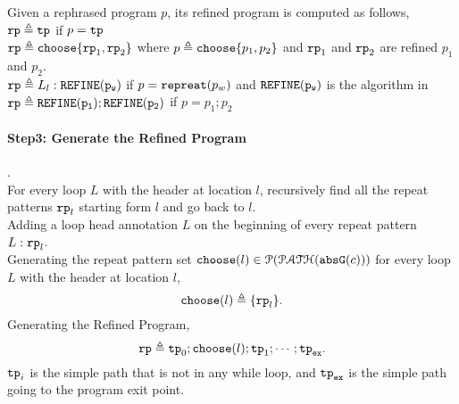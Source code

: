   Given a rephrased program $p$, its refined program is computed as follows,
  \\
  $\mathtt{rp} \triangleq \mathtt{tp} $ if $p = \mathtt{tp}$\\
  $\mathtt{rp} \triangleq \mathtt{choose}\{\mathtt{rp}_1, \mathtt{rp}_2 \}$ where $p \triangleq \mathtt{choose}\{p_1, p_2 \}$ and 
    $\mathtt{rp}_1$ and $\mathtt{rp}_2$ are refined $p_1$ and $p_2$. 
    \\
  $\mathtt{rp} \triangleq L_l : \mathtt{REFINE(p_w)}$  if $p = \mathtt{repreat}(p_w)$ and  $\mathtt{REFINE(p_w)}$ is the algorithm in \\
  $\mathtt{rp} \triangleq \mathtt{REFINE(p_1)}; \mathtt{REFINE(p_2)}$  if $p = p_1; p_2$ 
\paragraph{Step3: Generate the Refined Program}.
\\
For every loop $L$ with the header at location $l$,
recursively 
find all the repeat patterns $\mathtt{rp}_l$ starting form $l$ and go back to $l$.
\\
Adding a loop head annotation $L$ on the beginning of every repeat pattern $L: \mathtt{rp}_l$.
\\
Generating the repeat pattern set $\mathtt{choose}(l) \in \mathcal{P}(\mathcal{PATH}(\mathtt{abs}{\mathtt{G}}(c)))$
for every loop $L$ with the header at location $l$,
$$\mathtt{choose}(l) \triangleq \{ \mathtt{rp}_l \}.$$
Generating the Refined Program,
%
$$\mathtt{rp} \triangleq \mathtt{tp}_0; \mathtt{choose}(l) ; \mathtt{tp}_1; \cdots; \mathtt{tp}_{\mathtt{ex}}.$$
%
$\mathtt{tp}_i$ is the simple path that is not in any while loop,
and $\mathtt{tp}_{\mathtt{ex}}$ is the simple path going to the program exit point.
%
